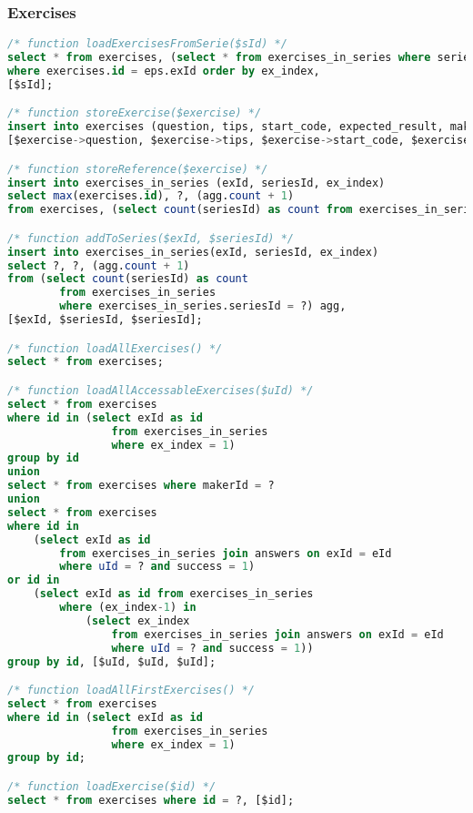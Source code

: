 \subsubsection{Exercises}
\begin{lstlisting}[language=sql]
/* function loadExercisesFromSerie($sId) */
select * from exercises, (select * from exercises_in_series where seriesId = ?) eps
where exercises.id = eps.exId order by ex_index,
[$sId];

/* function storeExercise($exercise) */
insert into exercises (question, tips, start_code, expected_result, makerId) VALUES (?, ?, ?, ?, ?),
[$exercise->question, $exercise->tips, $exercise->start_code, $exercise->expected_result, $exercise->makerId];

/* function storeReference($exercise) */
insert into exercises_in_series (exId, seriesId, ex_index)
select max(exercises.id), ?, (agg.count + 1)
from exercises, (select count(seriesId) as count from exercises_in_series where exercises_in_series.seriesId = ?) agg, [$exercise->seriesId, $exercise->seriesId];

/* function addToSeries($exId, $seriesId) */
insert into exercises_in_series(exId, seriesId, ex_index)
select ?, ?, (agg.count + 1)
from (select count(seriesId) as count 
        from exercises_in_series
        where exercises_in_series.seriesId = ?) agg,
[$exId, $seriesId, $seriesId];

/* function loadAllExercises() */
select * from exercises;

/* function loadAllAccessableExercises($uId) */
select * from exercises
where id in (select exId as id
                from exercises_in_series
                where ex_index = 1)
group by id
union
select * from exercises where makerId = ?
union
select * from exercises
where id in
    (select exId as id
        from exercises_in_series join answers on exId = eId
        where uId = ? and success = 1)
or id in
    (select exId as id from exercises_in_series
        where (ex_index-1) in
            (select ex_index
                from exercises_in_series join answers on exId = eId
                where uId = ? and success = 1))
group by id, [$uId, $uId, $uId];

/* function loadAllFirstExercises() */
select * from exercises
where id in (select exId as id
                from exercises_in_series
                where ex_index = 1)
group by id;

/* function loadExercise($id) */
select * from exercises where id = ?, [$id];


\end{lstlisting}
